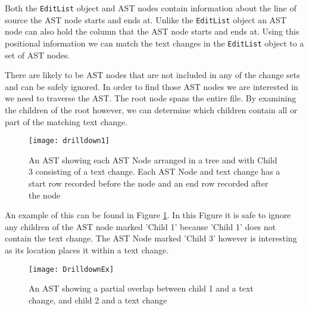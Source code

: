 \label{sec:over} 
Both the \lstinline{EditList} object and  AST nodes contain information about the line of source the AST node starts and ends at.  
Unlike the \lstinline{EditList} object an AST node can also hold the column that the AST node starts and ends at.  
Using this positional information we can match the text changes in the \lstinline{EditList} object to a set of AST nodes.

There are likely to be AST nodes that are not included in any of the change sets and can be safely ignored.
In order to find those AST nodes we are interested in we need to traverse the AST.
The root node spans the entire file. 
By examining the children of the root however, we can determine which children contain all or part of the matching text change.

\begin{figure}[!t]
 \begin{center}
  \texttt{[image: drilldown1]}
 \end{center}
 \caption{An AST showing each AST Node arranged in a tree and with Child 3 consisting of a text change.  Each AST Node and text change has a start row recorded before the node and an end row recorded after the node}
 \label{fig:findingASTNode}
\end{figure}

An example of this can be found in Figure \ref{fig:findingASTNode}.  In this Figure it is safe to ignore any children of the AST node marked 'Child 1' because 'Child 1' does not contain the text change.  The AST Node marked 'Child 3' however is interesting as its location places it within a text change. 


\begin{figure}[!t]
 \begin{center}
  \texttt{[image: DrilldownEx]}
 \end{center}
 \caption{An AST showing a partial overlap between child 1 and a text change, and child 2 and a text change}
 \label{fig:troubleASTNode}
\end{figure}

